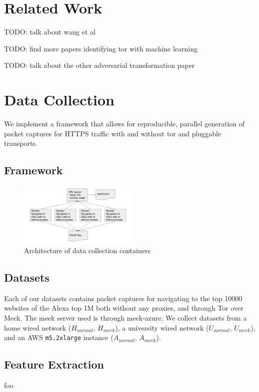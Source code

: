 \section{Related Work}
TODO: talk about wang et al

TODO: find more papers identifying tor with machine learning

TODO: talk about the other adversarial transformation paper

\section{Data Collection}
We implement a framework that allows for reproducible, parallel generation of packet captures for HTTPS traffic with and without tor and pluggable transports.
\subsection{Framework}
\begin{figure}
    \begin{center}
        \includegraphics[width=0.5\textwidth]{figures/data-collection-architecture}
    \end{center}
    \caption{\label{fig:data-collection-architecture} Architecture of data collection containers} 
\end{figure}
\subsection{Datasets}
Each of our datasets contains packet captures for navigating to the top 10000 websites of the Alexa top 1M %
both without any proxies, and through Tor over Meek. The meek server used is through meek-azure.
We collect datasets from a home wired network ($H_{normal}$, $H_{meek}$), a university wired network ($U_{normal}$, $U_{meek}$), and an AWS \texttt{m5.2xlarge} instance ($A_{normal}$, $A_{meek}$).
\subsection{Feature Extraction}
foo
